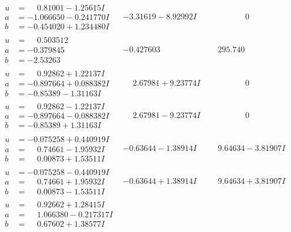 \documentclass[1p]{elsarticle_modified}
\theoremstyle{definition}
\begin{document}
$$\begin{array}{c|c|c}
\begin{aligned}
u &= \phantom{-}0.81001 - 1.25615 I \\
a &= -1.066650 - 0.241770 I \\
b &= -0.454020 + 1.234480 I\end{aligned}
 & -3.31619 - 8.92992 I & \phantom{-0.000000 } 0 \\ \hline\begin{aligned}
u &= \phantom{-}0.503512\phantom{ +0.000000I} \\
a &= -0.379845\phantom{ +0.000000I} \\
b &= -2.53263\phantom{ +0.000000I}\end{aligned}
 & -0.427603\phantom{ +0.000000I} & \phantom{-}295.740\phantom{ +0.000000I} \\ \hline\begin{aligned}
u &= \phantom{-}0.92862 + 1.22137 I \\
a &= -0.897664 + 0.088382 I \\
b &= -0.85389 - 1.31163 I\end{aligned}
 & \phantom{-}2.67981 + 9.23774 I & \phantom{-0.000000 } 0 \\ \hline\begin{aligned}
u &= \phantom{-}0.92862 - 1.22137 I \\
a &= -0.897664 - 0.088382 I \\
b &= -0.85389 + 1.31163 I\end{aligned}
 & \phantom{-}2.67981 - 9.23774 I & \phantom{-0.000000 } 0 \\ \hline\begin{aligned}
u &= -0.075258 + 0.440919 I \\
a &= \phantom{-}0.74661 - 1.95932 I \\
b &= \phantom{-}0.00873 + 1.53511 I\end{aligned}
 & -0.63644 - 1.38914 I & \phantom{-}9.64634 - 3.81907 I \\ \hline\begin{aligned}
u &= -0.075258 - 0.440919 I \\
a &= \phantom{-}0.74661 + 1.95932 I \\
b &= \phantom{-}0.00873 - 1.53511 I\end{aligned}
 & -0.63644 + 1.38914 I & \phantom{-}9.64634 + 3.81907 I \\ \hline\begin{aligned}
u &= \phantom{-}0.92662 + 1.28415 I \\
a &= \phantom{-}1.066380 - 0.217317 I \\
b &= \phantom{-}0.67602 + 1.38577 I\end{aligned}

\end{array}$$
\end{document}
